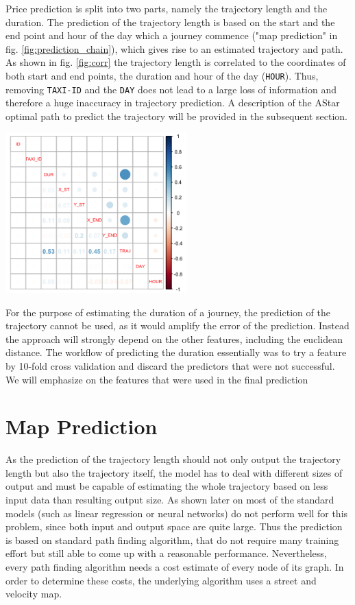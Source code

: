 \documentclass{article}
\newenvironment{Figure}
{\par\medskip\noindent\minipage{\linewidth}}
{\endminipage\par\medskip}
\begin{document}
\begin{multicols}{2}
Price prediction is split into two parts, namely the trajectory length and the duration. The prediction of the trajectory length is based on the start and the end point and hour of the day which a journey commence ("map prediction" in fig. \ref{fig:prediction_chain}), which gives rise to an estimated trajectory and path. As shown in fig. \ref{fig:corr} the trajectory length is correlated to the coordinates of both start and end points, the duration and hour of the day (\texttt{HOUR}). Thus, removing  \texttt{TAXI-ID} and the \texttt{DAY} does not lead to a large loss of information and therefore a huge inaccuracy in trajectory prediction. A description of the AStar optimal path to predict the trajectory will be provided in the subsequent section.

\begin{Figure}
\begin{center}
\includegraphics[width=7cm]{correlation_matrix.png}
\end{center}
\label{fig:corr}
\end{Figure}

For the purpose of estimating the duration of a journey, the prediction of the trajectory cannot be used, as it would amplify the error of the prediction. Instead the approach will strongly depend on the other features, including the euclidean distance. The workflow of predicting the duration essentially was to try a feature by 10-fold cross validation and discard the predictors that were not successful. We will emphasize on the features that were used in the final prediction


\section{Map Prediction}
As the prediction of the trajectory length should not only output the trajectory length but also the trajectory itself, the model has to deal with different sizes of output and must be capable of estimating the whole trajectory based on less input data than resulting output size. As shown later on most of the standard models (such as linear regression or neural networks) do not perform well for this problem, since both input and output space are quite large. Thus the prediction is based on standard path finding algorithm, that do not require many training effort but still able to come up with a reasonable performance. Nevertheless, every path finding algorithm needs a cost estimate of every node of its graph. In order to determine these costs, the underlying algorithm uses a street and velocity map. 


\end{multicols}
\end{document}
